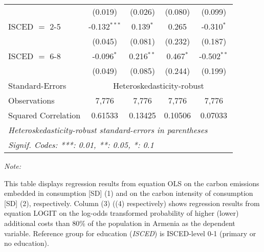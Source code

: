 \begin{table}[htbp!]
\begin{adjustbox}{width = 1\textwidth, max height = 0.95\textheight, center}
\begin{threeparttable}[b]
\begin{tabular}{lcccc}
                                 & (0.019)            & (0.026)            & (0.080)        & (0.099)\\   
            ISCED $=$ 2-5        & -0.132$^{***}$     & 0.139$^{*}$        & 0.265          & -0.310$^{*}$\\   
                                 & (0.045)            & (0.081)            & (0.232)        & (0.187)\\   
            ISCED $=$ 6-8        & -0.096$^{*}$       & 0.216$^{**}$       & 0.467$^{*}$    & -0.502$^{**}$\\   
                                 & (0.049)            & (0.085)            & (0.244)        & (0.199)\\   
            \midrule 
            Standard-Errors & \multicolumn{4}{c}{Heteroskedasticity-robust} \\ 
            Observations         & 7,776              & 7,776              & 7,776          & 7,776\\  
            Squared Correlation  & 0.61533            & 0.13425            & 0.10506        & 0.07033\\  
            \midrule \midrule
            \multicolumn{5}{l}{\emph{Heteroskedasticity-robust standard-errors in parentheses}}\\
            \multicolumn{5}{l}{\emph{Signif. Codes: ***: 0.01, **: 0.05, *: 0.1}}\\
         \end{tabular}
         
         \begin{tablenotes}\item \medskip \textit{Note:}
            \item This table displays regression results from equation OLS on the carbon emissions embedded in consumption [SD] (1) and on the carbon intensity of consumption [SD] (2), respectively. 
                                      Column (3) ((4) respectively) shows regression results from equation LOGIT on the log-odds transformed probability of higher (lower) additional costs than 80\% of the population in Armenia as the dependent variable. Reference group for education (\textit{ISCED}) is ISCED-level 0-1 (primary or no education).
         \end{tablenotes}
      \end{threeparttable}
   \end{adjustbox}
\end{table}


